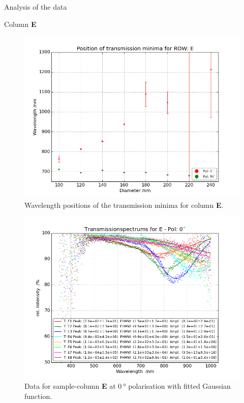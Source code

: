 \documentclass[pdftex, a4paper,11pt, twoside, UKenglish]{report}
\begin{document}
\begin{chapter}{Analysis of the data}
\begin{section}{Column \textbf{E}}
      \begin{figure}[b!]
        \centering
        \includegraphics[width=\textwidth]{Figures/MinimaPosE.png}
        \caption{Wavelength positions of the transmission minima for column
            \textbf{E}.}
        \label{fig:MinimaPosE}
      \end{figure}
      \newpage
      \begin{figure}[ht!]
        \centering
        \begin{minipage}{.95\textwidth}
          \centering
          \includegraphics[width=\textwidth]
              {Figures/TransspecFIT_EPol0.png}
          \caption{Data for sample-column \textbf{E} at $\SI{0}{\degree}$
              polarisation with fitted Gaussian function.}

\end{minipage}
\end{figure}
\end{section}
\end{chapter}
\end{document}

